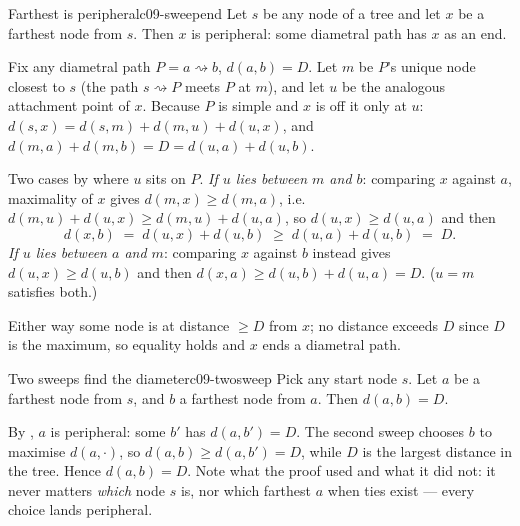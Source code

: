\begin{lemma}{Farthest is peripheral}{c09-sweepend}
Let $s$ be any node of a tree and let $x$ be a farthest node from $s$. Then $x$ is
peripheral: some diametral path has $x$ as an end.
\end{lemma}
\begin{proofbox}
Fix any diametral path $P = a \rightsquigarrow b$, $d(a,b)=D$. Let $m$ be $P$'s unique
node closest to $s$ (the path $s\rightsquigarrow P$ meets $P$ at $m$), and let $u$ be the
analogous attachment point of $x$. Because $P$ is simple and $x$ is off it only at $u$:
$d(s,x) = d(s,m) + d(m,u) + d(u,x)$, and $d(m,a)+d(m,b) = D = d(u,a)+d(u,b)$.

Two cases by where $u$ sits on $P$. \emph{If $u$ lies between $m$ and $b$}: comparing
$x$ against $a$, maximality of $x$ gives $d(m,x) \ge d(m,a)$, i.e.\
$d(m,u)+d(u,x) \ge d(m,u)+d(u,a)$, so $d(u,x) \ge d(u,a)$ and then
\[
  d(x,b) \;=\; d(u,x)+d(u,b) \;\ge\; d(u,a)+d(u,b) \;=\; D .
\]
\emph{If $u$ lies between $a$ and $m$}: comparing $x$ against $b$ instead gives
$d(u,x) \ge d(u,b)$ and then $d(x,a) \ge d(u,b)+d(u,a) = D$. ($u=m$ satisfies both.)

Either way some node is at distance $\ge D$ from $x$; no distance exceeds $D$ since $D$
is the maximum, so equality holds and $x$ ends a diametral path.
\end{proofbox}

\begin{theorem}{Two sweeps find the diameter}{c09-twosweep}
Pick any start node $s$. Let $a$ be a farthest node from $s$, and $b$ a farthest node
from $a$. Then $d(a,b) = D$.
\end{theorem}
\begin{proofbox}
By , $a$ is peripheral: some $b'$ has $d(a,b') = D$. The second
sweep chooses $b$ to maximise $d(a,\cdot)$, so $d(a,b) \ge d(a,b') = D$, while $D$ is
the largest distance in the tree. Hence $d(a,b) = D$. Note what the proof used and what
it did not: it never matters \emph{which} node $s$ is, nor which farthest $a$ when ties
exist --- every choice lands peripheral.
\end{proofbox}

